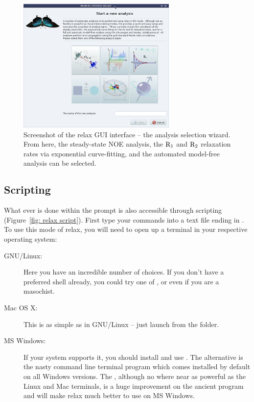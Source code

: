 \begin{figure}
\centerline{\includegraphics[width=0.7\textwidth, bb=14 14 657 560]{graphics/screenshots/analysis_wizard}}
\caption[GUI screenshot -- Analysis wizard screenshot]{Screenshot of the relax GUI interface -- the analysis selection wizard.  From here, the steady-state NOE analysis, the $\mathrm{R}_1$ and $\mathrm{R}_2$ relaxation rates via exponential curve-fitting, and the automated model-free analysis can be selected.}\label{fig: screenshot: analysis wizard}
\end{figure}




\subsection{Scripting} \label{sect: scripting}

What ever is done within the prompt is also accessible through scripting (Figure~\ref{fig: relax script}).  First type your commands into a text file ending in .  To use this mode of relax, you will need to open up a terminal in your respective operating system:

\begin{description}
\item[GNU/Linux:]  Here you have an incredible number of choices.  If you don't have a preferred shell already, you could try one of ,  or even  if you are a masochist.
\item[Mac OS X:]  This is as simple as in GNU/Linux -- just launch  from the  folder.
\item[MS Windows:]  If your system supports it, you should install and use .  The alternative is the nasty  command line terminal program which comes installed by default on all Windows versions.  The , although no where near as powerful as the Linux and Mac terminals, is a huge improvement on the ancient  program and will make relax much better to use on MS Windows.
\end{description}

